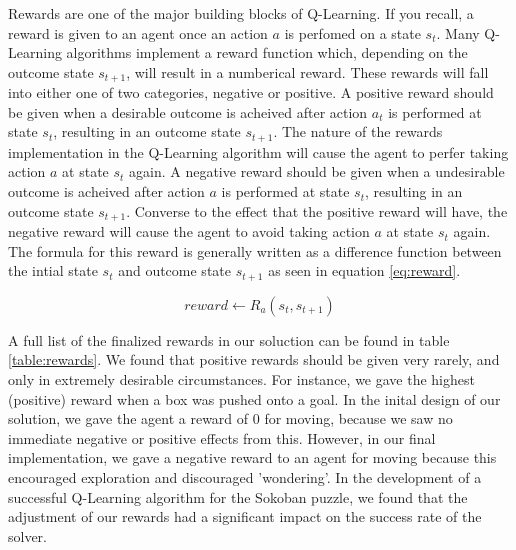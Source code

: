 \documentclass[times, 10pt,twocolumn]{article}
\begin{document}

Rewards are one of the major building blocks of Q-Learning.  If you recall, a reward is given to an agent once an action $a$ is perfomed on a state $s_t$.  Many Q-Learning algorithms implement a reward function which, depending on the outcome state $s_{t+1}$, will result in a numberical reward.  These rewards will fall into either one of two categories, negative or positive.  A positive reward should be given when a desirable outcome is acheived after action $a_t$ is performed at state $s_t$, resulting in an outcome state $s_{t+1}$.  The nature of the rewards implementation in the Q-Learning algorithm will cause the agent to perfer taking action $a$ at state $s_t$ again.  A negative reward should be given when a undesirable outcome is acheived after action $a$ is performed at state $s_t$, resulting in an outcome state $s_{t+1}$.  Converse to the effect that the positive reward will have, the negative reward will cause the agent to avoid taking action $a$ at state $s_t$ again.  The formula for this reward is generally written as a difference function between the intial state $s_t$ and outcome state $s_{t+1}$ as seen in equation \ref{eq:reward}.

\begin{equation}
reward \gets R_a(s_t, s_{t+1})
\label{eq:reward}
\end{equation}

A full list of the finalized rewards in our soluction can be found in table \ref{table:rewards}.  We found that positive rewards should be given very rarely, and only in extremely desirable circumstances.  For instance, we gave the highest (positive) reward when a box was pushed onto a goal.  In the inital design of our solution, we gave the agent a reward of 0 for moving, because we saw no immediate negative or positive effects from this.  However, in our final implementation, we gave a negative reward to an agent for moving because this encouraged exploration and discouraged 'wondering'.  In the development of a successful Q-Learning algorithm for the Sokoban puzzle, we found that the adjustment of our rewards had a significant impact on the success rate of the solver.
\end{document}
